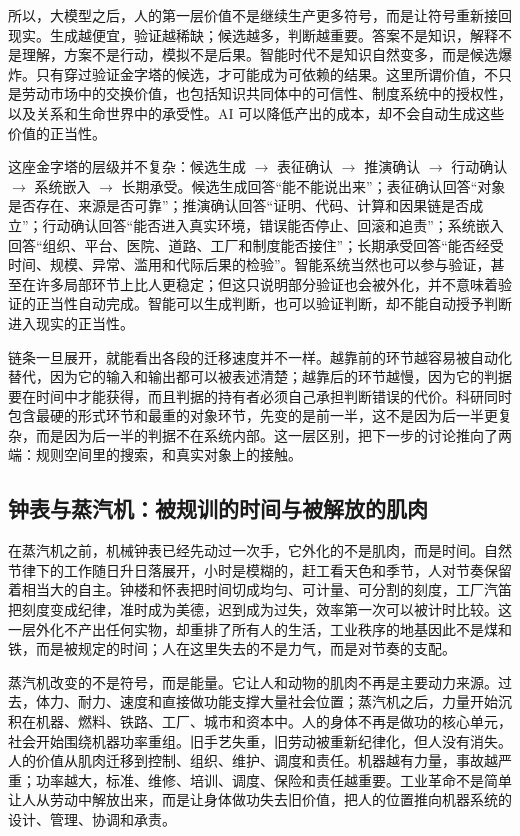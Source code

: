 所以，大模型之后，人的第一层价值不是继续生产更多符号，而是让符号重新接回现实。生成越便宜，验证越稀缺；候选越多，判断越重要。答案不是知识，解释不是理解，方案不是行动，模拟不是后果。智能时代不是知识自然变多，而是候选爆炸。只有穿过验证金字塔的候选，才可能成为可依赖的结果。这里所谓价值，不只是劳动市场中的交换价值，也包括知识共同体中的可信性、制度系统中的授权性，以及关系和生命世界中的承受性。AI 可以降低产出的成本，却不会自动生成这些价值的正当性。

这座金字塔的层级并不复杂：候选生成 $\to$ 表征确认 $\to$ 推演确认 $\to$ 行动确认 $\to$ 系统嵌入 $\to$ 长期承受。候选生成回答“能不能说出来”；表征确认回答“对象是否存在、来源是否可靠”；推演确认回答“证明、代码、计算和因果链是否成立”；行动确认回答“能否进入真实环境，错误能否停止、回滚和追责”；系统嵌入回答“组织、平台、医院、道路、工厂和制度能否接住”；长期承受回答“能否经受时间、规模、异常、滥用和代际后果的检验”。智能系统当然也可以参与验证，甚至在许多局部环节上比人更稳定；但这只说明部分验证也会被外化，并不意味着验证的正当性自动完成。智能可以生成判断，也可以验证判断，却不能自动授予判断进入现实的正当性。

链条一旦展开，就能看出各段的迁移速度并不一样。越靠前的环节越容易被自动化替代，因为它的输入和输出都可以被表述清楚；越靠后的环节越慢，因为它的判据要在时间中才能获得，而且判据的持有者必须自己承担判断错误的代价。科研同时包含最硬的形式环节和最重的对象环节，先变的是前一半，这不是因为后一半更复杂，而是因为后一半的判据不在系统内部。这一层区别，把下一步的讨论推向了两端：规则空间里的搜索，和真实对象上的接触。

\subsection{钟表与蒸汽机：被规训的时间与被解放的肌肉}


在蒸汽机之前，机械钟表已经先动过一次手，它外化的不是肌肉，而是时间。自然节律下的工作随日升日落展开，小时是模糊的，赶工看天色和季节，人对节奏保留着相当大的自主。钟楼和怀表把时间切成均匀、可计量、可分割的刻度，工厂汽笛把刻度变成纪律，准时成为美德，迟到成为过失，效率第一次可以被计时比较。这一层外化不产出任何实物，却重排了所有人的生活，工业秩序的地基因此不是煤和铁，而是被规定的时间；人在这里失去的不是力气，而是对节奏的支配。

蒸汽机改变的不是符号，而是能量。它让人和动物的肌肉不再是主要动力来源。过去，体力、耐力、速度和直接做功能支撑大量社会位置；蒸汽机之后，力量开始沉积在机器、燃料、铁路、工厂、城市和资本中。人的身体不再是做功的核心单元，社会开始围绕机器功率重组。旧手艺失重，旧劳动被重新纪律化，但人没有消失。人的价值从肌肉迁移到控制、组织、维护、调度和责任。机器越有力量，事故越严重；功率越大，标准、维修、培训、调度、保险和责任越重要。工业革命不是简单让人从劳动中解放出来，而是让身体做功失去旧价值，把人的位置推向机器系统的设计、管理、协调和承责。\cite{landes1969unbound}

